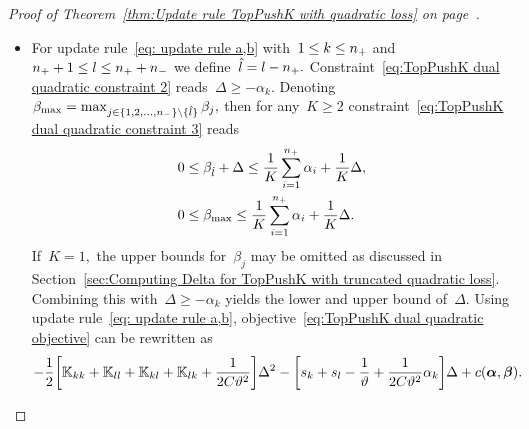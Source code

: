 \begin{proof}[Proof of Theorem~\ref{thm:Update rule TopPushK with quadratic loss} on page~\pageref{thm:Update rule TopPushK with quadratic loss}]
\begin{itemize}
    \item For update rule~\eqref{eq: update rule a,b} with~$1 \le k \le n_{+}$ and~$n_{+} + 1 \le l \le n_{+} + n_{-}$ we define~$\hat{l} = l - n_{+}.$ Constraint~\eqref{eq:TopPushK dual quadratic constraint 2} reads~$\Delta \geq - \alpha_k.$ Denoting~$\beta_{\max} = \max_{j \in \{1, 2, \ldots, n_{-} \} \setminus \{\hat{l}\}} \beta_j,$ then for any~$K \geq 2$ constraint~\eqref{eq:TopPushK dual quadratic constraint 3} reads
    \begin{equation}\label{eq: TopPushK dual quadratic a,b - bounds}
      \begin{aligned}
        0 & \leq \beta_{\hat{l}} + \Delta \leq \frac{1}{K} \sum_{i = 1}^{n_{+}} \alpha_i + \frac{1}{K} \Delta, \\
        0 & \leq \beta_{\max} \leq \frac{1}{K} \sum_{i = 1}^{n_{+}} \alpha_i + \frac{1}{K} \Delta.
      \end{aligned}
    \end{equation}
    If~$K = 1,$ the upper bounds for~$\beta_j$ may be omitted as discussed in Section~\ref{sec:Computing Delta for TopPushK with truncated quadratic loss}. Combining this with~$\Delta \geq - \alpha_k$ yields the lower and upper bound of~$\Delta.$ Using update rule~\eqref{eq: update rule a,b}, objective~\eqref{eq:TopPushK dual quadratic objective} can be rewritten as
    \begin{equation*}
      - \frac{1}{2} \Brac[s]{\K_{kk} + \K_{ll} + \K_{kl} + \K_{lk} + \frac{1}{2C\vartheta^2}} \Delta^2 - \Brac[s]{s_k + s_l - \frac{1}{\vartheta} + \frac{1}{2C\vartheta^2} \alpha_k} \Delta + c(\bm{\alpha}, \bm{\beta}).
    \end{equation*}


\end{itemize}
\end{proof}
